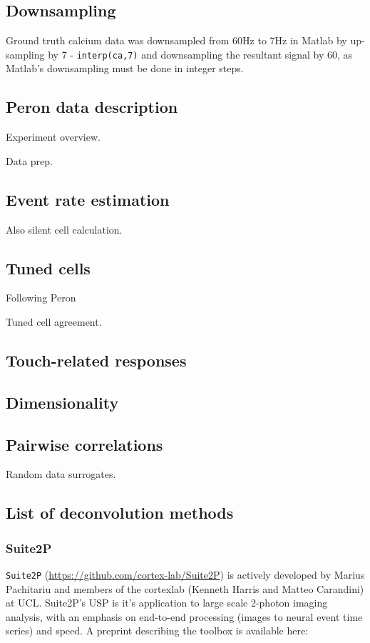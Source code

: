 \documentclass[a4paper,10pt,twocolumn]{article}
\begin{document}
\subsection*{Downsampling}
Ground truth calcium data was downsampled from 60Hz to 7Hz in Matlab by up-sampling by 7 - {\tt{interp(ca,7)}} and downsampling the resultant signal by 60, as Matlab's downsampling must be done in integer steps.

\subsection*{Peron data description}
Experiment overview. 

Data prep.

\subsection{Event rate estimation}

Also silent cell calculation.

\subsection{Tuned cells}
Following Peron

Tuned cell agreement.

\subsection{Touch-related responses}

\subsection{Dimensionality}

\subsection{Pairwise correlations}

Random data surrogates.

\subsection*{List of deconvolution methods}
\subsubsection*{Suite2P}
\texttt{Suite2P} (\href{https://github.com/cortex-lab/Suite2P}{https://github.com/cortex-lab/Suite2P}) is actively developed by  Marius Pachitariu and members of the cortexlab (Kenneth Harris and Matteo Carandini) at UCL. Suite2P's USP is it's application to large scale 2-photon imaging analysis, with an emphasis on end-to-end processing (images to neural event time series) and speed. A preprint describing the toolbox is available here:\\
\end{document}
